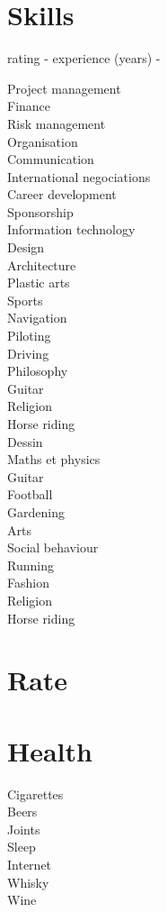 \documentclass[8pt]{article} %
\begin{document}
\section{Skills}

rating - experience (years) - 

Project management\\
Finance\\
Risk management\\
Organisation\\
Communication\\
International negociations\\
Career development\\
Sponsorship\\
Information technology\\
Design\\
Architecture\\
Plastic arts\\
Sports\\
Navigation\\
Piloting\\
Driving\\
Philosophy\\
Guitar\\
Religion\\
Horse riding\\
Dessin\\
Maths et physics\\
Guitar\\
Football\\
Gardening\\
Arts\\
Social behaviour\\
Running\\
Fashion\\
Religion\\
Horse riding\\


\section{Rate}

\begin{bchart}[min=0,max=10000,step=5000,unit=m\textsuperscript{2}]
  \smallskip
  \medskip
  \bigskip
\end{bchart}

\section{Health}
Cigarettes\\
Beers\\
Joints\\
Sleep\\
Internet\\
Whisky\\
Wine\\
\end{document}
